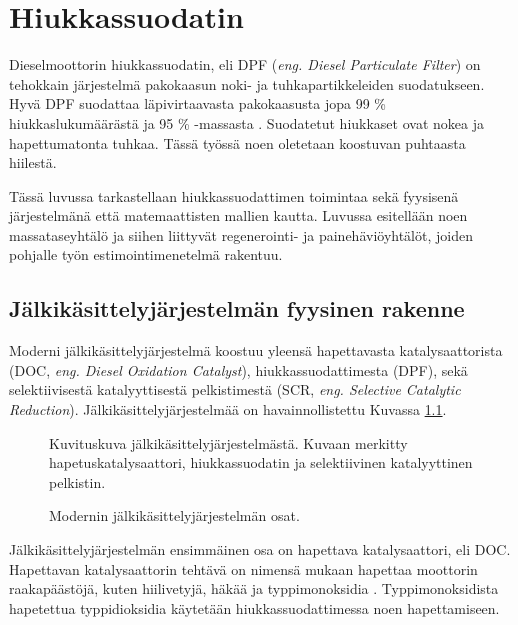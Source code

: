 \chapter{Hiukkassuodatin}%
\label{ch:dpf}



Dieselmoottorin hiukkassuodatin, eli DPF (\emph{eng. Diesel Particulate Filter}) on tehokkain järjestelmä pakokaasun noki- ja tuhkapartikkeleiden suodatukseen. 
Hyvä DPF suodattaa läpivirtaavasta pakokaasusta jopa 99 \% hiukkaslukumäärästä ja 95 \% -massasta \cite{Yan_state_of_the_art}. Suodatetut hiukkaset ovat nokea ja hapettumatonta tuhkaa. Tässä työssä noen oletetaan koostuvan puhtaasta hiilestä. 



Tässä luvussa tarkastellaan hiukkassuodattimen toimintaa sekä fyysisenä järjestelmänä että matemaattisten mallien kautta. Luvussa esitellään noen massataseyhtälö ja siihen liittyvät regenerointi- ja painehäviöyhtälöt, joiden pohjalle työn estimointimenetelmä rakentuu.


\section{Jälkikäsittelyjärjestelmän fyysinen rakenne}
Moderni jälkikäsittelyjärjestelmä koostuu yleensä hapettavasta katalysaattorista (DOC, \emph{eng. Diesel Oxidation Catalyst}), hiukkassuodattimesta (DPF), sekä selektiivisestä katalyyttisestä pelkistimestä (SCR, \emph{eng. Selective Catalytic Reduction}). 
Jälkikäsittelyjärjestelmää on havainnollistettu Kuvassa \ref{fig:EAT_full}. %
%
\begin{figure}[H]
    \centering
                {Kuvituskuva jälkikäsittelyjärjestelmästä. Kuvaan merkitty hapetuskatalysaattori, hiukkassuodatin ja selektiivinen katalyyttinen pelkistin.}
    \caption{Modernin jälkikäsittelyjärjestelmän osat.}
    \label{fig:EAT_full}
\end{figure}
%
Jälkikäsittelyjärjestelmän ensimmäinen osa on hapettava katalysaattori, eli DOC. 
Hapettavan katalysaattorin tehtävä on nimensä mukaan hapettaa moottorin raakapäästöjä, kuten hiilivetyjä, häkää ja typpimonoksidia \cite{dieselnet_doc}. Typpimonoksidista hapetettua typpidioksidia käytetään hiukkassuodattimessa noen hapettamiseen. 

